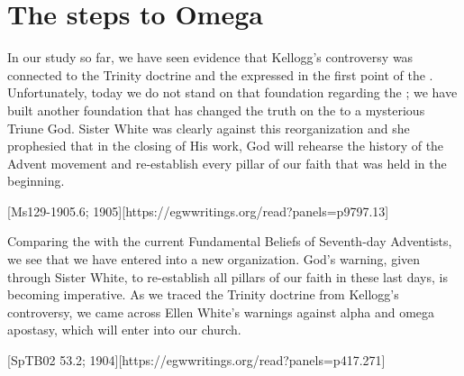 \chapter{The steps to Omega}

In our study so far, we have seen evidence that Kellogg’s controversy was connected to the Trinity doctrine and the  expressed in the first point of the . Unfortunately, today we do not stand on that foundation regarding the ; we have built another foundation that has changed the truth on the  to a mysterious Triune God. Sister White was clearly against this reorganization and she prophesied that in the closing of His work, God will rehearse the history of the Advent movement and re-establish every pillar of our faith that was held in the beginning.

[Ms129-1905.6; 1905][https://egwwritings.org/read?panels=p9797.13]

Comparing the  with the current Fundamental Beliefs of Seventh-day Adventists, we see that we have entered into a new organization. God’s warning, given through Sister White, to re-establish all pillars of our faith in these last days, is becoming imperative. As we traced the Trinity doctrine from Kellogg's controversy, we came across Ellen White’s warnings against alpha and omega apostasy, which will enter into our church.

[SpTB02 53.2; 1904][https://egwwritings.org/read?panels=p417.271]

